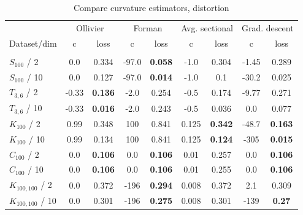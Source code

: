\documentclass{article} %
\begin{document}
\begin{table}[t]
\caption{Compare curvature estimators, distortion}
\label{tab:compare_distortion}
\begin{center}
\begin{tabular}{lcccccc|cc}
&
\multicolumn{2}{c}{Ollivier} &
\multicolumn{2}{c}{Forman} &
\multicolumn{2}{c}{Avg. sectional} &
\multicolumn{2}{|c}{Grad. descent} \\
Dataset/dim & c & loss  & c & loss  & c & loss  & c & loss \\%
 \hline \\
$S_{100}$ / 2 &
0.0 & 0.334 & 
-97.0 & \textbf{0.058} & 
-1.0 & 0.304 &
-1.45 & 0.289 \\
$S_{100}$ / 10 &
0.0 & 0.127 & 
-97.0 & \textbf{0.014} & 
-1.0 & 0.1 & 
-30.2 & 0.025 \\
$T_{3,6}$ / 2 &
-0.33 & \textbf{0.136} & 
-2.0 & 0.254 & 
-0.5 & 0.174 & 
-9.77 & 0.271  \\
$T_{3,6}$ / 10 &
-0.33 & \textbf{0.016} & 
-2.0 & 0.243 & 
-0.5 & 0.036 & 
0.0 & 0.077 \\
$K_{100}$ / 2 & 
0.99 & 0.348 & 
100 & 0.841 & 
0.125 & \textbf{0.342} & 
-48.7 & \textbf{0.163} \\
$K_{100}$ / 10 & 
0.99 & 0.134 & 
100 & 0.841 & 
0.125 & \textbf{0.124} & 
-305 & \textbf{0.015} \\
$C_{100}$ / 2 & 
0.0 & \textbf{0.106} & 
0.0 & \textbf{0.106} & 
0.01 & 0.257 &
0.0 & \textbf{0.106}  \\
$C_{100}$ / 10 & 
0.0 & \textbf{0.106} & 
0.0 & \textbf{0.106} & 
0.01 & 0.255 & 
0.0 & \textbf{0.106} \\
$K_{100,100}$ / 2 &
0.0 & 0.372 & 
-196 & \textbf{0.294} & 
0.008 & 0.372 & 
2.1 & 0.309 \\
$K_{100,100}$ / 10 &
0.0 & 0.301 & 
-196 & \textbf{0.275} & 
0.008 & 0.301 & 
-139 & \textbf{0.27} \\

\end{tabular}
\end{center}
\end{table}
\end{document}
